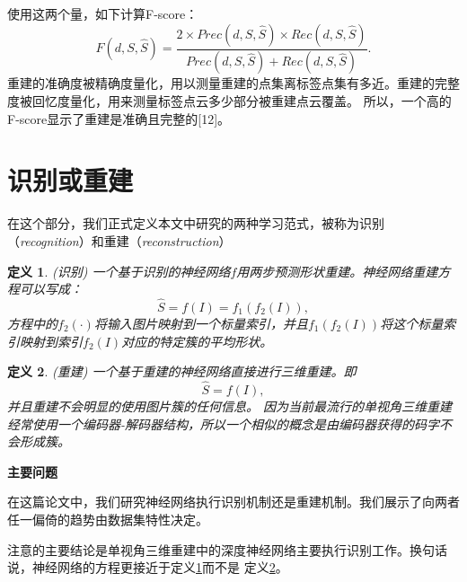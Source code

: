 \documentclass[bachelor, nocolorlinks, printoneside]{seuthesis} %
\newtheorem{theorem}{定义}
\begin{document}
\begin{Main}
使用这两个量，如下计算F-score：
\begin{equation} \label{eq:f-score}
    \textit{F}(\textit{d}, S, \widehat{S}) = \frac{2 \times \textit{Prec}(\textit{d}, S, \widehat{S})\times \textit{Rec}(\textit{d}, S, \widehat{S})}{\textit{Prec}(\textit{d}, S, \widehat{S}) + \textit{Rec}(\textit{d}, S, \widehat{S})}.
\end{equation}
重建的准确度被精确度量化，用以测量重建的点集离标签点集有多近。重建的完整度被回忆度量化，用来测量标签点云多少部分被重建点云覆盖。
所以，一个高的F-score显示了重建是准确且完整的[12]。
\section{识别或重建}
在这个部分，我们正式定义本文中研究的两种学习范式，被称为识别（\emph{recognition}）和重建（\emph{reconstruction}）

\begin{theorem}\label{def:recognition}(识别)
    一个基于识别的神经网络$f$用两步预测形状重建。神经网络重建方程可以写成：
\begin{equation}
        \widehat{S} = f(I) = f_1(f_2(I)),
\end{equation}
方程中的$f_2(\cdot)$将输入图片映射到一个标量索引，并且$f_1(f_2(I))$将这个标量索引映射到索引$f_2(I)$对应的特定簇的平均形状。
\end{theorem}

\begin{theorem}\label{def:reconstruction}(重建)
    一个基于重建的神经网络直接进行三维重建。即\begin{equation}
        \widehat{S} = f(I),
    \end{equation}
并且重建不会明显的使用图片簇的任何信息。
因为当前最流行的单视角三维重建经常使用一个编码器-解码器结构，所以一个相似的概念是由编码器获得的码字不会形成簇。
\end{theorem}
\textbf{主要问题}

在这篇论文中，我们研究神经网络执行识别机制还是重建机制。我们展示了向两者任一偏倚的趋势由数据集特性决定。

注意\cite{tatarchenko2019single}的主要结论是单视角三维重建中的深度神经网络主要执行识别工作。换句话说，神经网络的方程更接近于定义\ref{def:recognition}而不是
定义\ref{def:reconstruction}。

\end{Main}
\end{document}
